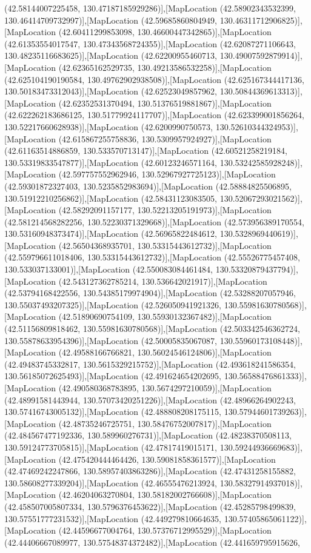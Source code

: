 (42.58144007225458, 130.47187185929286)],[MapLocation (42.58902343532399, 130.46414709732997)],[MapLocation (42.59685860804949, 130.46311712906825)],[MapLocation (42.60411299853098, 130.46600447342865)],[MapLocation (42.61353554017547, 130.47343568724355)],[MapLocation (42.62087271106643, 130.48235116683625)],[MapLocation (42.62200955460713, 130.49007592879914)],[MapLocation (42.62365162529735, 130.49213586532258)],[MapLocation (42.625104190190584, 130.49762902938508)],[MapLocation (42.625167344417136, 130.50183473312043)],[MapLocation (42.62523049857962, 130.50844369613313)],[MapLocation (42.62352531370494, 130.51376519881867)],[MapLocation (42.622262183686125, 130.51779924117707)],[MapLocation (42.623399001856264, 130.52217660628938)],[MapLocation (42.6200990750573, 130.52610344324953)],[MapLocation (42.615867255758836, 130.5309957924927)],[MapLocation (42.61163514886859, 130.533570713147)],[MapLocation (42.60521258219184, 130.53319833547877)],[MapLocation (42.60123246571164, 130.53242585928248)],[MapLocation (42.597757552962946, 130.52967927725123)],[MapLocation (42.59301872327403, 130.5235852983694)],[MapLocation (42.58884825506895, 130.51912210256862)],[MapLocation (42.58431123083505, 130.52067293021562)],[MapLocation (42.58292091157177, 130.52213205191973)],[MapLocation (42.581214568282256, 130.52230371329668)],[MapLocation (42.573956389170554, 130.53160948373474)],[MapLocation (42.56965822484612, 130.5328969440619)],[MapLocation (42.56504368935701, 130.53315443612732)],[MapLocation (42.559796611018406, 130.53315443612732)],[MapLocation (42.55526775457408, 130.533037133001)],[MapLocation (42.550083084461484, 130.53320879437794)],[MapLocation (42.543127362785214, 130.536642021917)],[MapLocation (42.53794168422556, 130.54385179974904)],[MapLocation (42.53288207057946, 130.55037493207325)],[MapLocation (42.526050941921326, 130.55981630780568)],[MapLocation (42.51890690754109, 130.55930132367482)],[MapLocation (42.51156809818462, 130.55981630780568)],[MapLocation (42.503342546362724, 130.55878633954396)],[MapLocation (42.50005835067087, 130.55960173108448)],[MapLocation (42.49588166766821, 130.56024546124806)],[MapLocation (42.49483745332817, 130.5615329215752)],[MapLocation (42.493618241586354, 130.56185072625493)],[MapLocation (42.491624654202695, 130.56588476861333)],[MapLocation (42.490580368783895, 130.5674297210059)],[MapLocation (42.48991581443944, 130.57073420251226)],[MapLocation (42.48966264902243, 130.57416743005132)],[MapLocation (42.488808208175115, 130.57944601739263)],[MapLocation (42.48735246725751, 130.58476752007817)],[MapLocation (42.484567477192336, 130.589960276731)],[MapLocation (42.48238370508113, 130.59124773705815)],[MapLocation (42.47817419015171, 130.59244936669683)],[MapLocation (42.475420444464426, 130.59081858361577)],[MapLocation (42.47469242247866, 130.58957403863286)],[MapLocation (42.47431258155882, 130.58608277339204)],[MapLocation (42.46555476213924, 130.58327914937018)],[MapLocation (42.46204063270804, 130.58182002766608)],[MapLocation (42.458507005807334, 130.5796376453622)],[MapLocation (42.45285798499839, 130.57551777231532)],[MapLocation (42.449279810664635, 130.57405865061122)],[MapLocation (42.44596677004764, 130.57376712995529)],[MapLocation (42.44406667089977, 130.57548374372482)],[MapLocation (42.441659795915626, 